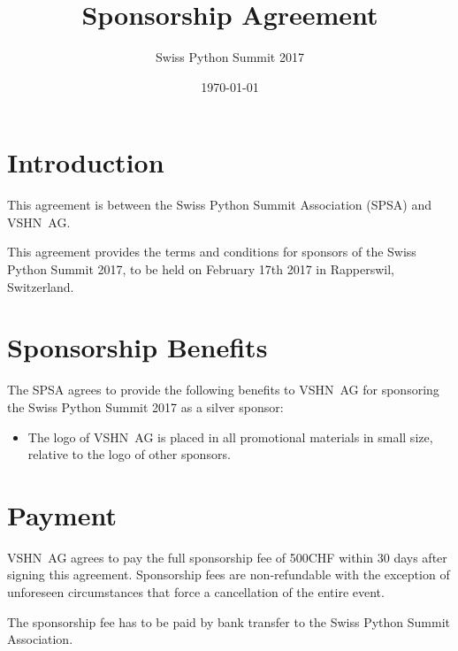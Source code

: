 \documentclass[11pt,enlargefirstpage=true,headlines=4]{scrartcl}
\title{Sponsorship Agreement}
\subtitle{Swiss Python Summit 2017}
\date{\today} %
\begin{document}
    \maketitle

    \section{Introduction}

    This agreement is between the Swiss Python Summit Association (SPSA) and
    VSHN~AG.

    This agreement provides the terms and conditions for sponsors of the Swiss
    Python Summit 2017, to be held on February 17th 2017 in Rapperswil,
    Switzerland.

    \section{Sponsorship Benefits}

    The SPSA agrees to provide the following benefits to VSHN~AG for
    sponsoring the Swiss Python Summit 2017 as a silver sponsor:

    \begin{itemize}
        \item The logo of VSHN~AG is placed in all promotional materials in small size, relative to the logo of other sponsors.
    \end{itemize}

    \section{Payment}

    VSHN~AG agrees to pay the full sponsorship fee of 500CHF within 30 days
    after signing this agreement. Sponsorship fees are non‐refundable with the
    exception of unforeseen circumstances that force a cancellation of the entire
    event.

    The sponsorship fee has to be paid by bank transfer to the Swiss Python
    Summit Association.

    \quad
\end{document}
